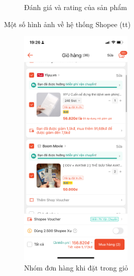 \begin{figure}[H]
\begin{subfigure}[b]{0.4\textwidth}
        \caption{Đánh giá và rating của sản phẩm}
    \end{subfigure}
    \caption{Một số hình ảnh về hệ thống Shopee (tt)}
\end{figure}
\begin{figure}[H]
    \centering
    \begin{subfigure}[b]{0.4\textwidth}
        \centering
        \includegraphics[width=0.6\textwidth]{Order_group.PNG}
        \caption{Nhóm đơn hàng khi đặt trong giỏ}
    \end{subfigure}
    \hfill
    \begin{subfigure}[b]{0.4\textwidth}
        \centering

\end{subfigure}
\end{figure}
